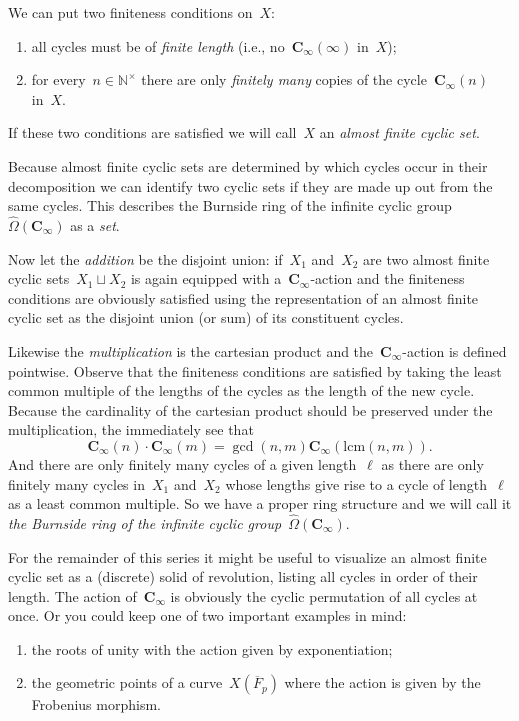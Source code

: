 \begin{definition}
  We can put two finiteness conditions on~$X$:
  \begin{enumerate}
    \item all cycles must be of \emph{finite length} (i.e., no~$\mathbf{C}_\infty(\infty)$ in~$X$);
    \item for every~$n\in\mathbb{N}^\times$ there are only \emph{finitely many} copies of the cycle~$\mathbf{C}_\infty(n)$ in~$X$.
  \end{enumerate}
  If these two conditions are satisfied we will call~$X$ an \emph{almost finite cyclic set}.
\end{definition}

Because almost finite cyclic sets are determined by which cycles occur in their decomposition we can identify two cyclic sets if they are made up out from the same cycles. This describes the Burnside ring of the infinite cyclic group~$\hat{\Omega}(\mathbf{C}_\infty)$ as a \emph{set}.

Now let the \emph{addition} be the disjoint union: if~$X_1$ and~$X_2$ are two almost finite cyclic sets~$X_1\sqcup X_2$ is again equipped with a~$\mathbf{C}_\infty$\nobreakdash-action and the finiteness conditions are obviously satisfied using the representation of an almost finite cyclic set as the disjoint union (or sum) of its constituent cycles.

Likewise the \emph{multiplication} is the cartesian product and the~$\mathbf{C}_\infty$\nobreakdash-action is defined pointwise. Observe that the finiteness conditions are satisfied by taking the least common multiple of the lengths of the cycles as the length of the new cycle. Because the cardinality of the cartesian product should be preserved under the multiplication, the immediately see that
\begin{equation}
  \mathbf{C}_\infty(n)\cdot\mathbf{C}_\infty(m)=\gcd(n,m)\mathbf{C}_\infty(\mathrm{lcm}(n,m)).
\end{equation}
And there are only finitely many cycles of a given length~$\ell$ as there are only finitely many cycles in~$X_1$ and~$X_2$ whose lengths give rise to a cycle of length~$\ell$ as a least common multiple. So we have a proper ring structure and we will call it \emph{the Burnside ring of the infinite cyclic group~$\hat{\Omega}(\mathbf{C}_\infty)$}.

For the remainder of this series it might be useful to visualize an almost finite cyclic set as a (discrete) solid of revolution, listing all cycles in order of their length. The action of~$\mathbf{C}_\infty$ is obviously the cyclic permutation of all cycles at once. Or you could keep one of two important examples in mind:
\begin{enumerate}
  \item the roots of unity with the action given by exponentiation;
  \item the geometric points of a curve~$X(\overline{F}_p)$ where the action is given by the Frobenius morphism.
\end{enumerate}

